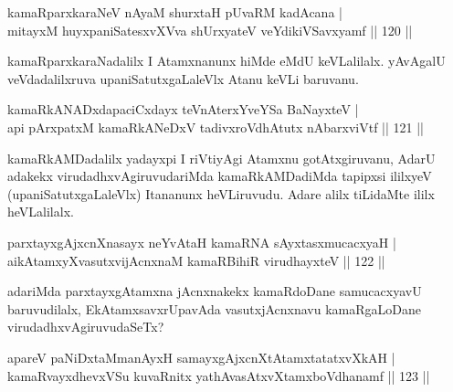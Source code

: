 
\begin{shl}
kamaRparxkaraNeV nAyaM shurxtaH pUvaRM kadAcana |\\
mitayxM huyxpaniSatesxvXVva shUrxyateV veYdikiVSavxyamf \hfill || 120 ||
\end{shl}

\begin{artha}
kamaRparxkaraNadalilx I Atamxnanunx hiMde eMdU keVLalilalx. yAvAgalU veVdadalilxruva upaniSatutxgaLaleVlx Atanu keVLi baruvanu.
\end{artha}


\begin{shl}
kamaRkANADxdapaciCxdayx teVnAterxYveYSa BaNayxteV |\\
api pArxpatxM kamaRkANeDxV tadivxroVdhAtutx nAbarxviVtf \hfill || 121 ||
\end{shl}

\begin{artha}
kamaRkAMDadalilx yadayxpi I riVtiyAgi Atamxnu gotAtxgiruvanu, AdarU adakekx virudadhxvAgiruvudariMda kamaRkAMDadiMda tapipxsi ililxyeV (upaniSatutxgaLaleVlx) Itananunx heVLiruvudu. Adare alilx tiLidaMte ililx heVLalilalx.
\end{artha}


\begin{shl}
parxtayxgAjxcnXnasayx neYvAtaH kamaRNA sAyxtasxmucacxyaH |\\
aikAtamxyXvasutxvijAcnxnaM kamaRBihiR virudhayxteV \hfill || 122 ||
\end{shl}

\begin{artha}
adariMda parxtayxgAtamxna jAcnxnakekx kamaRdoDane samucacxyavU baruvudilalx, EkAtamxsavxrUpavAda vasutxjAcnxnavu kamaRgaLoDane virudadhxvAgiruvudaSeTx?
\end{artha}


\begin{shl}
apareV paNiDxtaMmanAyxH samayxgAjxcnXtAtamxtatatxvXkAH |\\
kamaRvayxdhevxVSu kuvaRnitx yathAvasAtxvXtamxboVdhanamf \hfill || 123 ||
\end{shl}

